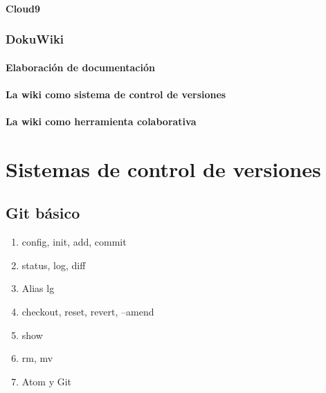 \documentclass[a4paper,11pt,spanish]{sphinxmanual}
\begin{document}
\subsubsection{Cloud9}
\label{\detokenize{introduccion:id39}}

\subsection{DokuWiki}
\label{\detokenize{introduccion:id40}}

\subsubsection{Elaboración de documentación}
\label{\detokenize{introduccion:id41}}

\subsubsection{La wiki como sistema de control de versiones}
\label{\detokenize{introduccion:id42}}

\subsubsection{La wiki como herramienta colaborativa}
\label{\detokenize{introduccion:id43}}

\chapter{Sistemas de control de versiones}
\label{\detokenize{introduccion:id44}}

\section{Git básico}
\label{\detokenize{introduccion:id45}}\begin{enumerate}
\item {} 
config, init, add, commit

\item {} 
status, log, diff

\item {} 
Alias lg

\item {} 
checkout, reset, revert, --amend

\item {} 
show

\item {} 
rm, mv

\item {} 
Atom y Git

\end{enumerate}
\end{document}
